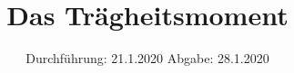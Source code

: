 

\subject{Versuch Nr. 101}
\title{Das Trägheitsmoment}
\date{%
  Durchführung: 21.1.2020
  \hspace{3em}
  Abgabe: 28.1.2020
}


\setlength{\parindent}{0pt} %

\maketitle
\thispagestyle{empty}
\tableofcontents
\newpage








\printbibliography{}


